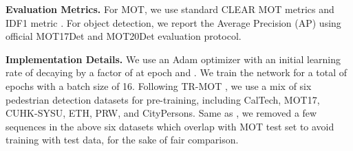 \documentclass[letterpaper, 10 pt, conference]{ieeeconf}
\begin{document}
\vspace{1mm}\noindent\textbf{Evaluation Metrics.} For MOT, we use standard CLEAR MOT metrics \cite{Bernardin2008} and IDF1 metric \cite{ristani2016performance}. For object detection, we report the Average Precision (AP) using official MOT17Det and MOT20Det evaluation protocol. 

\vspace{1mm}\noindent\textbf{Implementation Details.}
We use an Adam optimizer with an initial learning rate of  decaying by a factor of  at epoch  and . We train the network for a total of  epochs with a batch size of 16. Following TR-MOT \cite{Wang2019}, we use a mix of six pedestrian detection datasets for pre-training, including CalTech\cite{caltech}, MOT17\cite{Milan2016}, CUHK-SYSU\cite{cuhk}, ETH\cite{eth}, PRW\cite{zheng2017person}, and CityPersons\cite{8099957}. Same as \cite{Wang2019}, we removed a few sequences in the above six datasets which overlap with MOT test set to avoid training with test data, for the sake of fair comparison.
\end{document}
